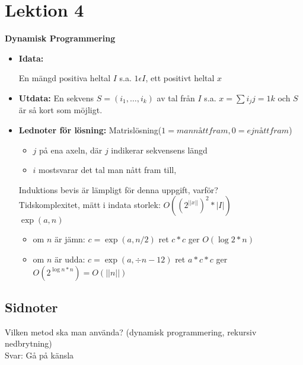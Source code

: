 \section{Lektion 4}
\textbf{Dynamisk Programmering}

\begin{itemize}
\item{\textbf{Idata:}

    En mängd positiva heltal $I$ s.a. \(1 \epsilon I\), ett positivt heltal $x$
  }
\item{\textbf{Utdata:}
    En sekvens \(S = (i_1,\ldots,i_k)\) av tal från $I$ s.a. \(x =
    \sum{i_j}{j=1}{k}\) och $S$ är så kort som möjligt.
  }

\item{\textbf{Lednoter för lösning:}
    Matrislösning(\( 1 = man nått fram, 0 = ej nått fram\))
    \begin{itemize}
      \item $j$ på ena axeln, där $j$ indikerar sekvensens längd
      \item $i$ mostsvarar det tal man nått fram till,
      \end{itemize}
      Induktions bevis är lämpligt för denna uppgift, varför?\\

      Tidskomplexitet, mätt i indata storlek: \(O((2^{||x||})^2*|I|)\)\\
      \(\exp(a,n)\)
      \begin{itemize}
      \item om $n$ är jämn: \(c=\exp(a,n/2)\) ret \(c*c\) ger \(O(\log{2}*n)\)
      \item om $n$ är udda: \(c=\exp(a,\div{n-1}{2})\) ret \(a*c*c\) ger \(O(2^{\log{n}*n})
        = O(||n||)\)

      \end{itemize}
  }
  
\end{itemize}
  

\subsection{Sidnoter}

Vilken metod ska man använda? (dynamisk programmering, rekursiv nedbrytning)\\
Svar: Gå på känsla